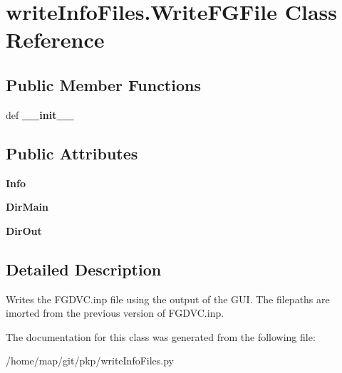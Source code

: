 \hypertarget{classwriteInfoFiles_1_1WriteFGFile}{\section{write\-Info\-Files.\-Write\-F\-G\-File \-Class \-Reference}
\label{classwriteInfoFiles_1_1WriteFGFile}
}
\subsection*{\-Public \-Member \-Functions}
\begin{DoxyCompactItemize}
\item 
\hypertarget{classwriteInfoFiles_1_1WriteFGFile_a8793f110fb135f44905fac930e831930}{def {\bfseries \-\_\-\-\_\-init\-\_\-\-\_\-}}\label{classwriteInfoFiles_1_1WriteFGFile_a8793f110fb135f44905fac930e831930}

\end{DoxyCompactItemize}
\subsection*{\-Public \-Attributes}
\begin{DoxyCompactItemize}
\item 
\hypertarget{classwriteInfoFiles_1_1WriteFGFile_a77d8f83a7d486949524d77f921915872}{{\bfseries \-Info}}\label{classwriteInfoFiles_1_1WriteFGFile_a77d8f83a7d486949524d77f921915872}

\item 
\hypertarget{classwriteInfoFiles_1_1WriteFGFile_ab9edf3e6e6d3ffd8565da7e9c3865599}{{\bfseries \-Dir\-Main}}\label{classwriteInfoFiles_1_1WriteFGFile_ab9edf3e6e6d3ffd8565da7e9c3865599}

\item 
\hypertarget{classwriteInfoFiles_1_1WriteFGFile_ab167764423f862e5ea9e9bcbea6ca8aa}{{\bfseries \-Dir\-Out}}\label{classwriteInfoFiles_1_1WriteFGFile_ab167764423f862e5ea9e9bcbea6ca8aa}

\end{DoxyCompactItemize}


\subsection{\-Detailed \-Description}
\begin{DoxyVerb}Writes the FGDVC.inp file using the output of the GUI. The filepaths are imorted from the previous version of FGDVC.inp.\end{DoxyVerb}
 

\-The documentation for this class was generated from the following file\-:\begin{DoxyCompactItemize}
\item 
/home/map/git/pkp/write\-Info\-Files.\-py\end{DoxyCompactItemize}
